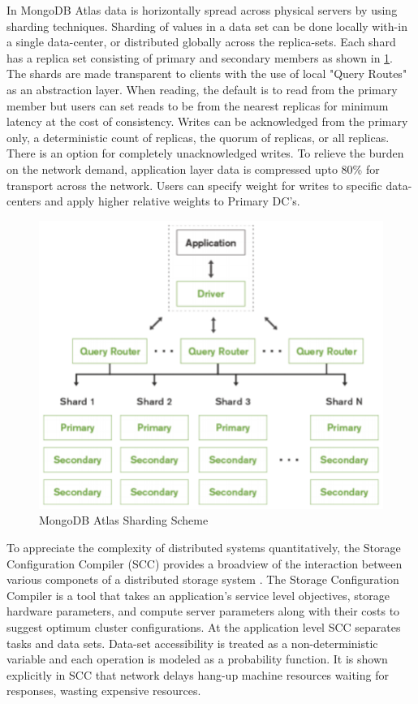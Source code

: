 \documentclass[conference]{IEEEtran}
\begin{document}
In MongoDB Atlas data is horizontally spread across physical servers by using sharding techniques. Sharding of values in a data set can be done locally with-in a single data-center, or distributed globally across the replica-sets. Each shard has a replica set consisting of primary and secondary members as shown in \ref{mongo_shards}. The shards are made transparent to clients with the use of local "Query Routes" as an abstraction layer. When reading, the default is to read from the primary member but users can set reads to be from the nearest replicas for minimum latency at the cost of consistency. Writes can be acknowledged from the primary only, a deterministic count of replicas, the quorum of replicas, or all replicas. There is an option for completely unacknowledged writes. To relieve the burden on the network demand, application layer data is compressed upto 80\% for transport across the network. Users can specify weight for writes to specific data-centers and apply higher relative weights to Primary DC's.

\begin{figure}[htbp]
\centering
\includegraphics[scale=.5]{mongo_shards.eps}
\caption{MongoDB Atlas Sharding Scheme \cite{Mongo}}
\label{mongo_shards}
\end{figure}

To appreciate the complexity of distributed systems quantitatively, the Storage Configuration Compiler (SCC) provides a broadview of the interaction between various componets of a distributed storage system \cite{scc}. The Storage Configuration Compiler is a tool that takes an application's service level objectives, storage hardware parameters, and compute server parameters along with their costs to suggest optimum cluster configurations. At the application level SCC separates tasks and data sets. Data-set accessibility is treated as a non-deterministic variable and each operation is modeled as a probability function. It is shown explicitly in SCC that network delays hang-up machine resources waiting for responses, wasting expensive resources. 
\end{document}
